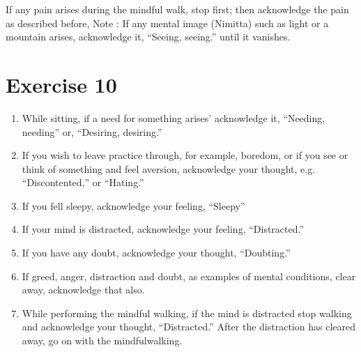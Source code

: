 \documentclass[a5paper,10pt,english]{book}
\begin{document}
\sphinxAtStartPar
If any pain arises during the mindful walk, stop first; then acknowledge the pain as described before,
Note : If any mental image (Nimitta) such as light or a mountain arises, acknowledge it, “Seeing, seeing.” until it vanishes.


\section{Exercise 10}
\label{\detokenize{practice:exercise-10}}\begin{enumerate}
%
\item {} 
\sphinxAtStartPar
While sitting, if a need for something arises’ acknowledge it, “Needing, needing” or, “Desiring, desiring.”

\item {} 
\sphinxAtStartPar
If you wish to leave practice through, for example, boredom, or if you see or think of something and feel aversion, acknowledge your thought, e.g. “Discontented,” or “Hating.”

\item {} 
\sphinxAtStartPar
If you fell sleepy, acknowledge your feeling, “Sleepy”

\item {} 
\sphinxAtStartPar
If your mind is distracted, acknowledge your feeling, “Distracted.”

\item {} 
\sphinxAtStartPar
If you have any doubt, acknowledge your thought, “Doubting.”

\item {} 
\sphinxAtStartPar
If greed, anger, distraction and doubt, as examples of mental conditions, clear away, acknowledge that also.

\item {} 
\sphinxAtStartPar
While performing the mindful walking, if the mind is distracted stop walking and acknowledge your thought, “Distracted.” After the distraction has cleared away, go on with the mindful\sphinxhyphen{}walking.

\end{enumerate}
\end{document}
